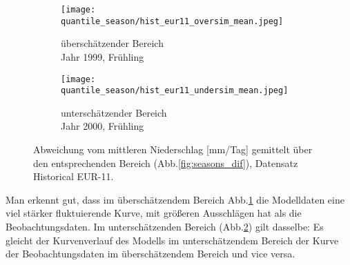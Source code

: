\begin{figure}[h]
	\begin{subfigure}{0.49\textwidth}
		\texttt{[image: quantile\_season/hist\_eur11\_oversim\_mean.jpeg]}
		\caption{überschätzender Bereich\\Jahr 1999, Frühling}
		\label{fig:seasons:hist_eur11:oversim_mean}
	\end{subfigure}
	\begin{subfigure}{0.49\textwidth}
		\texttt{[image: quantile\_season/hist\_eur11\_undersim\_mean.jpeg]}
		\caption{unterschätzender Bereich\\Jahr 2000, Frühling}
		\label{fig:seasons:hist_eur11:undersim_mean}
	\end{subfigure}
	\caption{Abweichung vom mittleren Niederschlag [mm/Tag] gemittelt über den entsprechenden Bereich (Abb.\ref{fig:seasons_dif}), Datensatz Historical EUR-11.}
	\label{fig:seasons:hist_eur11:overundersim_mean}
\end{figure}
Man erkennt gut, dass im überschätzendem Bereich Abb.\ref{fig:seasons:hist_eur11:oversim_mean} die Modelldaten eine viel stärker fluktuierende Kurve, mit größeren Ausschlägen hat als die Beobachtungsdaten.
Im unterschätzenden Bereich (Abb.\ref{fig:seasons:hist_eur11:undersim_mean}) gilt dasselbe: Es gleicht der Kurvenverlauf des Modells im unterschätzendem Bereich der Kurve der Beobachtungsdaten im überschätzendem Bereich und vice versa.\newpage

